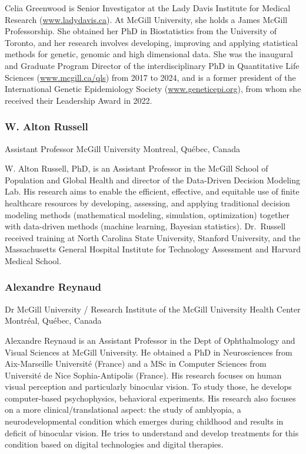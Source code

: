 \documentclass[
]{book}
\begin{document}
Celia Greenwood is Senior Investigator at the Lady Davis Institute for Medical Research (\url{www.ladydavis.ca}). At McGill University, she holds a James McGill Professorship. She obtained her PhD in Biostatistics from the University of Toronto, and her research involves developing, improving and applying statistical methods for genetic, genomic and high dimensional data. She was the inaugural and Graduate Program Director of the interdisciplinary PhD in Quantitative Life Sciences (\url{www.mcgill.ca/qls}) from 2017 to 2024, and is a former president of the International Genetic Epidemiology Society (\url{www.geneticepi.org}), from whom she received their Leadership Award in 2022.

\subsubsection{W. Alton Russell}\label{w.-alton-russell}

Assistant Professor
McGill University
Montreal, Québec, Canada

W. Alton Russell, PhD, is an Assistant Professor in the McGill School of Population and Global Health and director of the Data-Driven Decision Modeling Lab. His research aims to enable the efficient, effective, and equitable use of finite healthcare resources by developing, assessing, and applying traditional decision modeling methods (mathematical modeling, simulation, optimization) together with data-driven methods (machine learning, Bayesian statistics). Dr.~Russell received training at North Carolina State University, Stanford University, and the Massachusetts General Hospital Institute for Technology Assessment and Harvard Medical School.

\subsubsection{Alexandre Reynaud}\label{alexandre-reynaud}

Dr
McGill University / Research Institute of the McGill University Health Center
Montréal, Québec, Canada

Alexandre Reynaud is an Assistant Professor in the Dept of Ophthalmology and Visual Sciences at McGill University. He obtained a PhD in Neurosciences from Aix-Marseille Université (France) and a MSc in Computer Sciences from Université de Nice Sophia-Antipolis (France). His research focuses on human visual perception and particularly binocular vision. To study those, he develops computer-based psychophysics, behavioral experiments. His research also focuses on a more clinical/translational aspect: the study of amblyopia, a neurodevelopmental condition which emerges during childhood and results in deficit of binocular vision. He tries to understand and develop treatments for this condition based on digital technologies and digital therapies.
\end{document}
